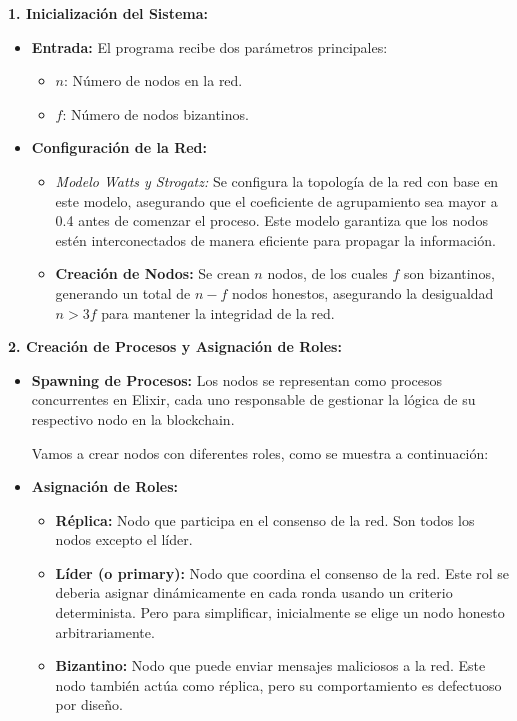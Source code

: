 {\large{
    \textbf{1. Inicialización del Sistema:}
    \begin{itemize}
        \item \textbf{Entrada:} El programa recibe dos parámetros principales:
        \begin{itemize}
            \item $n$: Número de nodos en la red.
            \item $f$: Número de nodos bizantinos.
        \end{itemize}
        \item \textbf{Configuración de la Red:}
        \begin{itemize}
            \item \textit{Modelo Watts y Strogatz:} Se configura la topología de la red con base en este modelo, asegurando que el coeficiente de agrupamiento sea mayor a 0.4 antes de comenzar el proceso. Este modelo garantiza que los nodos estén interconectados de manera eficiente para propagar la información.
            \item \textbf{Creación de Nodos:} Se crean $n$ nodos, de los cuales $f$ son bizantinos, generando un total de $n - f$ nodos honestos, asegurando la desigualdad $n > 3f$ para mantener la integridad de la red.
        \end{itemize}
    \end{itemize}

    \vspace{0.5cm}

    \textbf{2. Creación de Procesos y Asignación de Roles:}
    \begin{itemize}
        \item \textbf{Spawning de Procesos:} Los nodos se representan como procesos concurrentes en Elixir, cada uno responsable de gestionar la lógica de su respectivo nodo en la blockchain. 
        
        Vamos a crear nodos con diferentes roles, como se muestra a continuación:
        \item \textbf{Asignación de Roles:}
        \begin{itemize}
            \item \textbf{Réplica:} Nodo que participa en el consenso de la red. Son todos los nodos excepto el líder.
            \item \textbf{Líder (o primary):} Nodo que coordina el consenso de la red. Este rol se deberia asignar dinámicamente en cada ronda usando un criterio determinista. Pero para simplificar, inicialmente se elige un nodo honesto arbitrariamente.
            \item \textbf{Bizantino:} Nodo que puede enviar mensajes maliciosos a la red. Este nodo también actúa como réplica, pero su comportamiento es defectuoso por diseño.
        \end{itemize}


\end{itemize}}}
